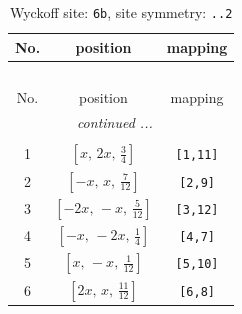 \documentclass[fleqn,8pt]{jsarticle}
\begin{document}
\begin{longtable}{ccc}
\caption{Wyckoff site: {\tt 6b}, site symmetry: {\tt ..2}}
 \\
 \hline \hline
No. & position & mapping \\ \hline \endfirsthead

\multicolumn{2}{l}{\tablename\ \thetable{}} \\
 \hline \hline
No. & position & mapping \\ \hline \endhead

 \hline \hline
\multicolumn{2}{r}{\footnotesize\it continued ...} \\ \endfoot

 \hline \hline
\multicolumn{2}{r}{} \\ \endlastfoot

1 & $\left[ x,\, 2 x,\, \frac{3}{4} \right]$ & {\tt [1,11]} \\ \hline
2 & $\left[ - x,\, x,\, \frac{7}{12} \right]$ & {\tt [2,9]} \\ \hline
3 & $\left[ - 2 x,\, - x,\, \frac{5}{12} \right]$ & {\tt [3,12]} \\ \hline
4 & $\left[ - x,\, - 2 x,\, \frac{1}{4} \right]$ & {\tt [4,7]} \\ \hline
5 & $\left[ x,\, - x,\, \frac{1}{12} \right]$ & {\tt [5,10]} \\ \hline
6 & $\left[ 2 x,\, x,\, \frac{11}{12} \right]$ & {\tt [6,8]} \\
\end{longtable}
\renewcommand{\arraystretch}{1.2}
\end{document}
